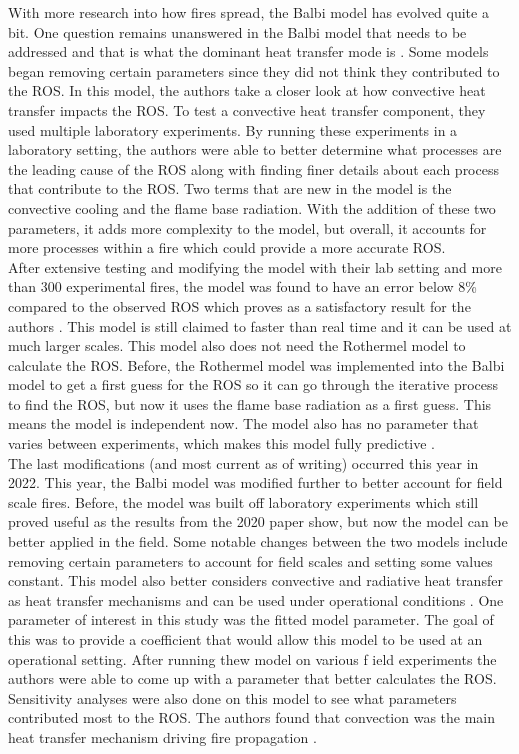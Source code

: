 \documentclass{article}
\begin{document}
\indent With more research into how fires spread, the Balbi model has evolved quite a bit. One question remains unanswered in the Balbi model that needs to be addressed and that is what the dominant heat transfer mode is \citep{Balbi2020}. Some models began removing certain parameters since they did not think they contributed to the ROS. In this model, the authors take a closer look at how convective heat transfer impacts the ROS. To test a convective heat transfer component, they used multiple laboratory experiments. By running these experiments in a laboratory setting, the authors were able to better determine what processes are the leading cause of the ROS along with finding finer details about each process that contribute to the ROS. Two terms that are new in the model is the convective cooling and the flame base radiation. With the addition of these two parameters, it adds more complexity to the model, but overall, it accounts for more processes within a fire which could provide a more accurate ROS. \\
\indent After extensive testing and modifying the model with their lab setting and more than 300 experimental fires, the model was found to have an error below 8\% compared to the observed ROS which proves as a satisfactory result for the authors \citep{Balbi2020}. This model is still claimed to faster than real time and it can be used at much larger scales. This model also does not need the Rothermel model to calculate the ROS. Before, the Rothermel model was implemented into the Balbi model to get a first guess for the ROS so it can go through the iterative process to find the ROS, but now it uses the flame base radiation as a first guess. This means the model is independent now. The model also has no parameter that varies between experiments, which makes this model fully predictive \citep{Chatelon2022}.  \\
\indent The last modifications (and most current as of writing) occurred this year in 2022. This year, the Balbi model was modified further to better account for field scale fires. Before, the model was built off laboratory experiments which still proved useful as the results from the 2020 paper show, but now the model can be better applied in the field. Some notable changes between the two models include removing certain parameters to account for field scales and setting some values constant. This model also better considers convective and radiative heat transfer as heat transfer mechanisms and can be used under operational conditions \citep{Chatelon2022}. One parameter of interest in this study was the fitted model parameter. The goal of this was to provide a coefficient that would allow this model to be used at an operational setting. After running thew model on various f ield experiments the authors were able to come up with a parameter that better calculates the ROS. Sensitivity analyses were also done on this model to see what parameters contributed most to the ROS. The authors found that convection was the main heat transfer mechanism driving fire propagation \citep{Chatelon2022}. \\
\end{document}
